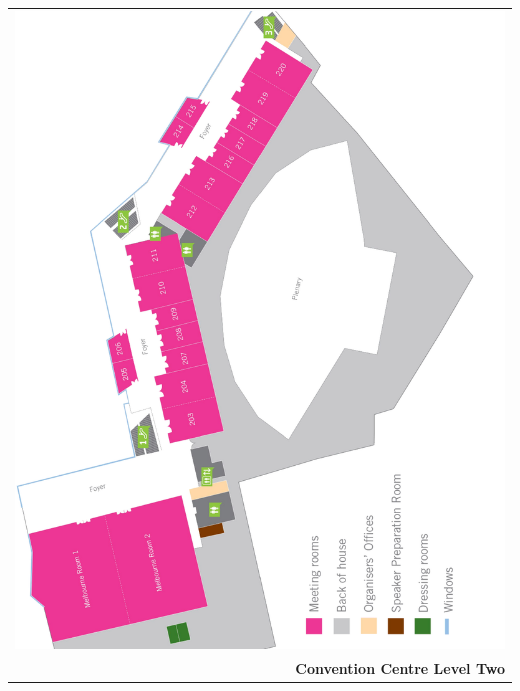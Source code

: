 \pagebreak
\thispagestyle{empty}
\begin{center}
  \begin{tabular}{r}
    \includegraphics[width=\textwidth]{content/maps/mcec_floor2.pdf} \\[3em]
    {\Large \textbf{Convention Centre Level Two}}
  \end{tabular}
\end{center}
